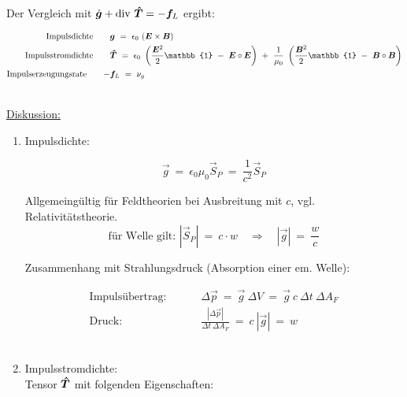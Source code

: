 \ \\
Der Vergleich mit $\dot{\bm{g}} + \text{div }\bm{\hat{T}} = - \bm{f}_L$ ergibt:

\begin{align*}
\text{Impulsdichte} \qquad & \vec{g} \ = \ \epsilon_0 \ (\vec{E}\times\vec{B})\\
\text{Impulsstromdichte} \qquad & \tens{T} \ = \ \epsilon_0 \ \left(\frac{\vec{E}^2}{2} \mathbb{1} \ - \ \vec{E}\circ\vec{E}\right) \ + \ \frac{1}{\mu_0} \ \left(\frac{\vec{B}^2}{2}\mathbb{1} \ - \ \vec{B}\circ\vec{B}\right)\\
\text{Impulserzeugungsrate} \qquad - & \vec{f}_L \ = \ \nu_g
\end{align*}

\ \\
\underline{Diskussion:}

\begin{enumerate}[label = \roman*]
\item Impulsdichte:\

\begin{equation*}
\vec{g} \ = \ \epsilon_0\mu_0 \vec{S}_P \ = \ \frac{1}{c^2}\vec{S}_P
\end{equation*} 

Allgemeingültig für Feldtheorien bei Ausbreitung mit $c$, vgl. Relativitätstheorie.
\begin{equation*}
\text{für Welle gilt: } |\vec{S}_P| \ = \ c \cdot w \quad \Rightarrow \quad |\vec{g}| \ = \ \frac{w}{c} 
\end{equation*}

Zusammenhang mit Strahlungsdruck (Absorption einer em. Welle): 

\begin{align*}
\text{Impulsübertrag:  } \qquad & \Delta \vec{p} \ = \ \vec{g} \ \Delta V \ = \ \vec{g} \ c \ \Delta t \ \Delta A_F\\
\text{Druck: } \qquad & \frac{|\Delta\vec{p}|}{\Delta t \ \Delta A_F} \ = \ c \ |\vec{g}| \ = \ w
\end{align*}
\ \\

\item Impulsstromdichte: \\

Tensor $\bm{\hat{T}}$ mit folgenden Eigenschaften:


\end{enumerate}
